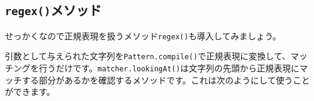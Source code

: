 \hypertarget{chapter6-regexux30e1ux30bdux30c3ux30c9}{%
\subsection{\texorpdfstring{\texttt{regex()}メソッド}{regex()メソッド}}\label{chapter6-regexux30e1ux30bdux30c3ux30c9}}

せっかくなので正規表現を扱うメソッド\texttt{regex()}も導入してみましょう。

\begin{Shaded}
\begin{Highlighting}[]
 
     \NormalTok{\textgreater{} }\NormalTok{(}
            \NormalTok{()) \{}
                  \NormalTok{\textless{}\textgreater{}(}
\NormalTok{())}
\NormalTok{                );}
\NormalTok{            \} }\NormalTok{ \{}
                 \NormalTok{;}
\NormalTok{            \}}
\NormalTok{        \};}
\NormalTok{    \}}
\NormalTok{\}}
\end{Highlighting}
\end{Shaded}

引数として与えられた文字列を\texttt{Pattern.compile()}で正規表現に変換して、マッチングを行うだけです。\texttt{matcher.lookingAt()}は文字列の先頭から正規表現にマッチする部分があるかを確認するメソッドです。これは次のようにして使うことができます。

\begin{Shaded}
\begin{Highlighting}[]
\NormalTok{(}
\NormalTok{ (} \NormalTok{\textless{}}\NormalTok{\textgreater{}(}\NormalTok{, }\NormalTok{(}\NormalTok{));}
\end{Highlighting}
\end{Shaded}


